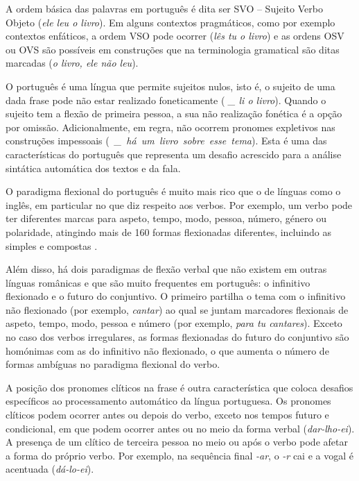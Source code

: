 \begin{multicols}{2}

A ordem básica das palavras em português é dita ser SVO --  Sujeito Verbo Objeto (\textit{ele leu o livro}). 
Em alguns contextos pragmáticos, como por exemplo contextos enfáticos, a ordem VSO pode ocorrer (\textit{lês tu o livro}) 
e as ordens OSV ou OVS são possíveis em construções que na terminologia gramatical são ditas marcadas (\textit{o livro, ele não leu}).

O português é uma língua que permite sujeitos nulos, isto é, o sujeito de uma dada frase pode não estar realizado foneticamente (\textit{ \_ li o livro}). 
Quando o sujeito tem a flexão de primeira pessoa, a sua não realização fonética é a opção por omissão. 
Adicionalmente, em regra, não ocorrem pronomes expletivos
nas construções impessoais \mbox{(\ \textit{\_ há um livro sobre esse tema})}. 
Esta é uma das características do português que representa um desafio acrescido para a análise sintática automática dos textos e da fala.

O paradigma flexional do português é muito mais rico que o de línguas como o inglês, em particular no que diz respeito aos verbos.
Por exemplo, um verbo pode ter diferentes marcas para aspeto, tempo, modo, pessoa, número, género ou polaridade,
atingindo mais de 160 formas flexionadas diferentes, incluindo as simples e compostas \cite{branco}.


Além disso, há dois paradigmas de flexão verbal que não existem em outras línguas românicas e que são muito frequentes em português: o infinitivo flexionado e o futuro do conjuntivo. O primeiro partilha o tema com o infinitivo não flexionado (por exemplo, \textit{cantar}) ao qual se juntam marcadores flexionais
de aspeto, tempo, modo, pessoa e número (por exemplo, \textit{para tu cantares}).
Exceto no caso dos verbos irregulares, as formas flexionadas do futuro do conjuntivo são homónimas com as do infinitivo não flexionado,  
o que aumenta o número de formas ambíguas no paradigma flexional do verbo.

A posição dos pronomes clíticos na frase é outra ca\-rac\-te\-rís\-ti\-ca que coloca desafios específicos ao processamento 
automático da língua portuguesa. Os pronomes clíticos podem ocorrer antes ou depois do verbo, exceto nos tempos futuro e condicional, 
em que podem ocorrer antes ou no meio da forma verbal (\textit{dar-lho-ei}). 
A presença de um clítico de terceira pessoa no meio ou após o verbo pode afetar a forma do próprio verbo.
Por exemplo, na sequência final \textit{-ar}, o \textit{-r} cai e a vogal é acentuada (\textit{dá-lo-ei}).




\end{multicols}

